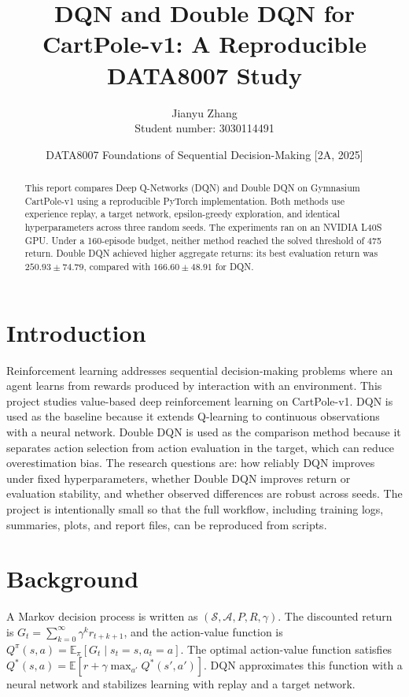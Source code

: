 \documentclass{article}
\title{DQN and Double DQN for CartPole-v1: A Reproducible DATA8007 Study}
\author{Jianyu Zhang\\Student number: 3030114491}
\date{DATA8007 Foundations of Sequential Decision-Making [2A, 2025]}
\begin{document}
\maketitle

\begin{abstract} This report compares Deep Q-Networks (DQN) and Double DQN on Gymnasium CartPole-v1 using a reproducible PyTorch implementation. Both methods use experience replay, a target network, epsilon-greedy exploration, and identical hyperparameters across three random seeds. The experiments ran on an NVIDIA L40S GPU. Under a 160-episode budget, neither method reached the solved threshold of 475 return. Double DQN achieved higher aggregate returns: its best evaluation return was $250.93 \pm 74.79$, compared with $166.60 \pm 48.91$ for DQN. \end{abstract}
\section{Introduction} Reinforcement learning addresses sequential decision-making problems where an agent learns from rewards produced by interaction with an environment. This project studies value-based deep reinforcement learning on CartPole-v1. DQN is used as the baseline because it extends Q-learning to continuous observations with a neural network. Double DQN is used as the comparison method because it separates action selection from action evaluation in the target, which can reduce overestimation bias.
The research questions are: how reliably DQN improves under fixed hyperparameters, whether Double DQN improves return or evaluation stability, and whether observed differences are robust across seeds. The project is intentionally small so that the full workflow, including training logs, summaries, plots, and report files, can be reproduced from scripts.
\section{Background} A Markov decision process is written as $(\mathcal{S}, \mathcal{A}, P, R, \gamma)$. The discounted return is $G_t=\sum_{k=0}^{\infty}\gamma^k r_{t+k+1}$, and the action-value function is $Q^{\pi}(s,a)=\mathbb{E}_{\pi}[G_t \mid s_t=s,a_t=a]$. The optimal action-value function satisfies $Q^*(s,a)=\mathbb{E}[r+\gamma\max_{a'}Q^*(s',a')]$. DQN approximates this function with a neural network and stabilizes learning with replay and a target network.
\end{document}

